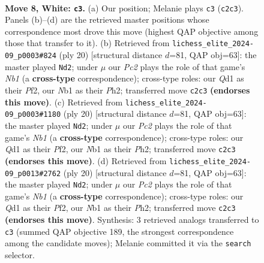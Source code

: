 \documentclass[11pt]{article}
\begin{document}
\begin{figure}[p]\centering
\begin{subfigure}{0.46\textwidth}\centering
\resizebox{\linewidth}{!}{%
\newchessgame
\chessboard[
  setfen={rnbq1rk1/p4ppp/1p1bpn2/2pp4/3P4/3BPNB1/PPP2PPP/RN1Q1RK1 w - - 0 8},
  showmover=false,
  pgfstyle=straightmove, color=movearrow, markmove={c2-c3}
]}
\caption{}
\end{subfigure}\hfill
\begin{subfigure}{0.46\textwidth}\centering
\resizebox{\linewidth}{!}{%
\newchessgame
\chessboard[
  setfen={rn1q1rk1/pb2bppp/1pp1pn2/3pN3/2PP4/1PB3P1/P3PPBP/RN1Q1RK1 w - - 2 11},
  showmover=false,
  pgfstyle=straightmove, color=movearrow, markmove={b1-d2}
]}
\caption{}
\end{subfigure}
\\[4pt]
\begin{subfigure}{0.46\textwidth}\centering
\resizebox{\linewidth}{!}{%
\newchessgame
\chessboard[
  setfen={rn1q1rk1/pb2bppp/1pp1pn2/3pN3/2PP4/1PB3P1/P3PPBP/RN1Q1RK1 w - - 2 11},
  showmover=false,
  pgfstyle=straightmove, color=movearrow, markmove={b1-d2}
]}
\caption{}
\end{subfigure}\hfill
\begin{subfigure}{0.46\textwidth}\centering
\resizebox{\linewidth}{!}{%
\newchessgame
\chessboard[
  setfen={rn1q1rk1/pb2bppp/1pp1pn2/3pN3/2PP4/1PB3P1/P3PPBP/RN1Q1RK1 w - - 2 11},
  showmover=false,
  pgfstyle=straightmove, color=movearrow, markmove={b1-d2}
]}
\caption{}
\end{subfigure}
\caption{\textbf{Move 8, White: \texttt{c3}.} (a) Our position; Melanie plays \texttt{c3} (\texttt{c2c3}). Panels (b)--(d) are the retrieved master positions whose correspondence most drove this move (highest QAP objective among those that transfer to it). (b) Retrieved from \texttt{lichess\_elite\_2024-09\_p0003\#824} (ply 20) [structural distance $d$=81, QAP obj=63]: the master played \texttt{Nd2}; under $\mu$ our \emph{Pc2} plays the role of that game's \emph{Nb1} (a \textbf{cross-type} correspondence); cross-type roles: our \emph{Q}d1 as their \emph{P}f2, our \emph{N}b1 as their \emph{P}h2; transferred move \texttt{c2c3} \textbf{(endorses this move)}. (c) Retrieved from \texttt{lichess\_elite\_2024-09\_p0003\#1180} (ply 20) [structural distance $d$=81, QAP obj=63]: the master played \texttt{Nd2}; under $\mu$ our \emph{Pc2} plays the role of that game's \emph{Nb1} (a \textbf{cross-type} correspondence); cross-type roles: our \emph{Q}d1 as their \emph{P}f2, our \emph{N}b1 as their \emph{P}h2; transferred move \texttt{c2c3} \textbf{(endorses this move)}. (d) Retrieved from \texttt{lichess\_elite\_2024-09\_p0013\#2762} (ply 20) [structural distance $d$=81, QAP obj=63]: the master played \texttt{Nd2}; under $\mu$ our \emph{Pc2} plays the role of that game's \emph{Nb1} (a \textbf{cross-type} correspondence); cross-type roles: our \emph{Q}d1 as their \emph{P}f2, our \emph{N}b1 as their \emph{P}h2; transferred move \texttt{c2c3} \textbf{(endorses this move)}. Synthesis: 3 retrieved analogs transferred to \texttt{c3} (summed QAP objective 189, the strongest correspondence among the candidate moves); Melanie committed it via the \texttt{search} selector.}
\label{fig:thought-m14}
\end{figure}
\end{document}
